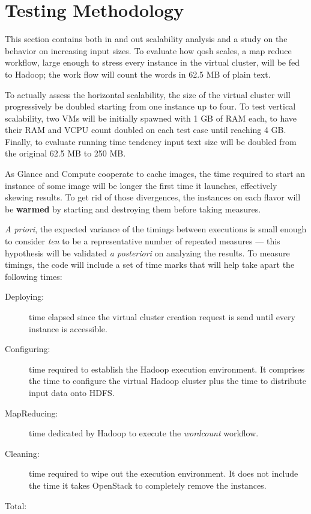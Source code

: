\section{Testing Methodology}\label{sec:metodologiaprueba}
\noindent This section contains both in and out scalability analysis and a study on the behavior on increasing input sizes. To evaluate how qosh scales, a map reduce workflow, large enough to stress every instance in the virtual cluster, will be fed to Hadoop; the work flow will count the words in 62.5 MB of plain text.

To actually assess the horizontal scalability, the size of the virtual cluster will progressively be doubled starting from one instance up to four. To test vertical scalability, two VMs will be initially spawned with 1 GB of RAM each, to have their RAM and VCPU count doubled on each test case until reaching 4 GB. Finally, to evaluate running time tendency input text size will be doubled from the original 62.5 MB to 250 MB.

As Glance and Compute cooperate to cache images, the time required to start an instance of some image will be longer the first time it launches, effectively skewing results. To get rid of those divergences, the instances on each flavor will be \textbf{warmed} by starting and destroying them before taking measures.

\emph{A priori}, the expected variance of the timings between executions is small enough to consider \emph{ten} to be a representative number of repeated measures --- this hypothesis will be validated \emph{a posteriori} on analyzing the results. To measure timings, the code will include a set of time marks that will help take apart the following times:

\begin{description}
    \item[Deploying:] time elapsed since the virtual cluster creation request is send until every instance is accessible.
    \item[Configuring:] time required to establish the Hadoop execution environment. It comprises the time to configure the virtual Hadoop cluster plus the time to distribute input data onto HDFS.
    \item[MapReducing:] time dedicated by Hadoop to execute the \emph{wordcount} workflow.
    \item[Cleaning:] time required to wipe out the execution environment. It does not include the time it takes OpenStack to completely remove the instances.
    \item[Total:] 
\end{description}

